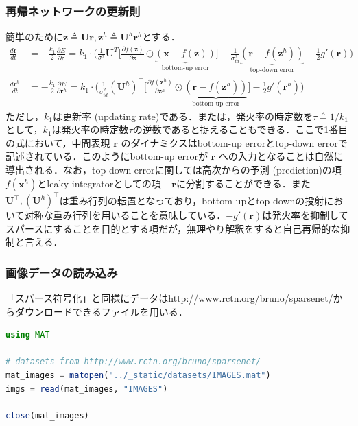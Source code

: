 \subsubsection{再帰ネットワークの更新則}
簡単のために$\mathbf{z}\triangleq\mathbf{U}\mathbf{r}, \mathbf{z}^h\triangleq\mathbf{U}^h\mathbf{r}^h$とする．
\begin{align}
\frac{d \mathbf{r}}{d t}&=-\frac{k_{1}}{2} \frac{\partial E}{\partial \mathbf{r}}=k_{1}\cdot\Bigg(\frac{1}{\sigma^{2}} \mathbf{U}^{T}\bigg[\frac{\partial f(\mathbf{z})}{\partial \mathbf{z}}\odot\underbrace{(\mathbf{x}-f(\mathbf{z}))}_{\text{bottom-up error}}\bigg]-\frac{1}{\sigma_{t d}^{2}}\underbrace{\left(\mathbf{r}-f(\mathbf{z}^h)\right)}_{\text{top-down error}}-\frac{1}{2}g'(\mathbf{r})\Bigg)\\
\frac{d \mathbf{r}^h}{d t}&=-\frac{k_{1}}{2} \frac{\partial E}{\partial \mathbf{r}^h}=k_{1}\cdot\Bigg(\frac{1}{\sigma_{t d}^{2}}(\mathbf{U}^h)^\top\bigg[\frac{\partial f(\mathbf{z}^h)}{\partial \mathbf{z}^h}\odot\underbrace{\left(\mathbf{r}-f(\mathbf{z}^h)\right)}_{\text{bottom-up error}}\bigg]-\frac{1}{2}g'(\mathbf{r}^h)\Bigg)
\end{align}
ただし，$k_1$は更新率 (updating rate)である．または，発火率の時定数を$\tau\triangleq1/k_1$として，$k_1$は発火率の時定数$\tau$の逆数であると捉えることもできる．ここで1番目の式において，中間表現 $\mathbf{r}$ のダイナミクスはbottom-up errorとtop-down errorで記述されている．このようにbottom-up errorが $\mathbf{r}$ への入力となることは自然に導出される．なお，top-down errorに関しては高次からの予測 (prediction)の項 $f(\mathbf{x}^h)$とleaky-integratorとしての項 $-\mathbf{r}$に分割することができる．また$\mathbf{U}^\top, (\mathbf{U}^h)^\top$は重み行列の転置となっており，bottom-upとtop-downの投射において対称な重み行列を用いることを意味している．$-g'(\mathbf{r})$は発火率を抑制してスパースにすることを目的とする項だが，無理やり解釈をすると自己再帰的な抑制と言える．
\subsubsection{画像データの読み込み}
「スパース符号化」と同様にデータは\url{http://www.rctn.org/bruno/sparsenet/}からダウンロードできるファイルを用いる．
\begin{lstlisting}[language=julia]
using MAT

# datasets from http://www.rctn.org/bruno/sparsenet/
mat_images = matopen("../_static/datasets/IMAGES.mat")
imgs = read(mat_images, "IMAGES")

close(mat_images)
\end{lstlisting}
